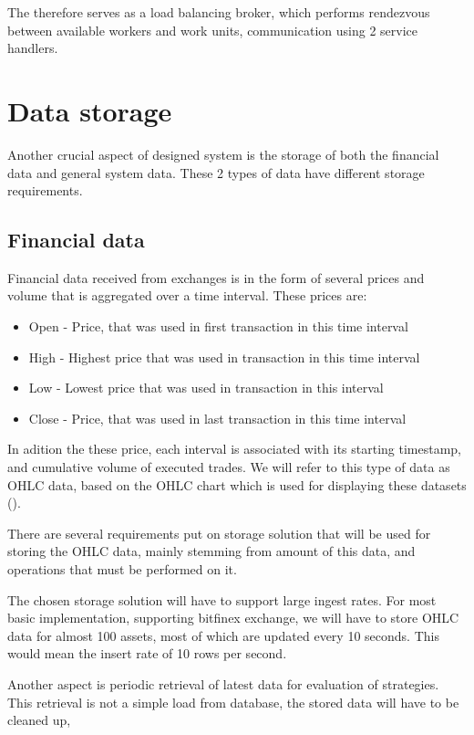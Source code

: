 The  therefore serves as a load balancing broker, which performs rendezvous between available workers
and work units, communication using 2 service handlers.

\section{Data storage}
Another crucial aspect of designed system is the storage of both the financial data and general system data.
These 2 types of data have different storage requirements.

\subsection{Financial data}
Financial data received from exchanges is in the form of several prices and volume that is aggregated over a time interval.
These prices are:
\begin{itemize}
    \item{Open - } Price, that was used in first transaction in this time interval
    \item{High - } Highest price that was used in transaction in this time interval
    \item{Low - }  Lowest price that was used in transaction in this interval
    \item{Close -} Price, that was used in last transaction in this time interval
\end{itemize}
In adition the these price, each interval is associated with its starting timestamp, and cumulative volume
of executed trades. We will refer to this type of data as OHLC data, based on the OHLC chart which is used for displaying
these datasets ().

There are several requirements put on storage solution that will be used for storing the OHLC data, mainly stemming from
amount of this data, and operations that must be performed on it.

The chosen storage solution will have to support large ingest rates. For most basic implementation, supporting bitfinex exchange,
we will have to store OHLC data for almost 100 assets, most of which are updated every 10 seconds. This would mean
the insert rate of 10 rows per second.

Another aspect is periodic retrieval of latest data for evaluation of strategies. This retrieval is not a simple load from database,
the stored data will have to be cleaned up,

